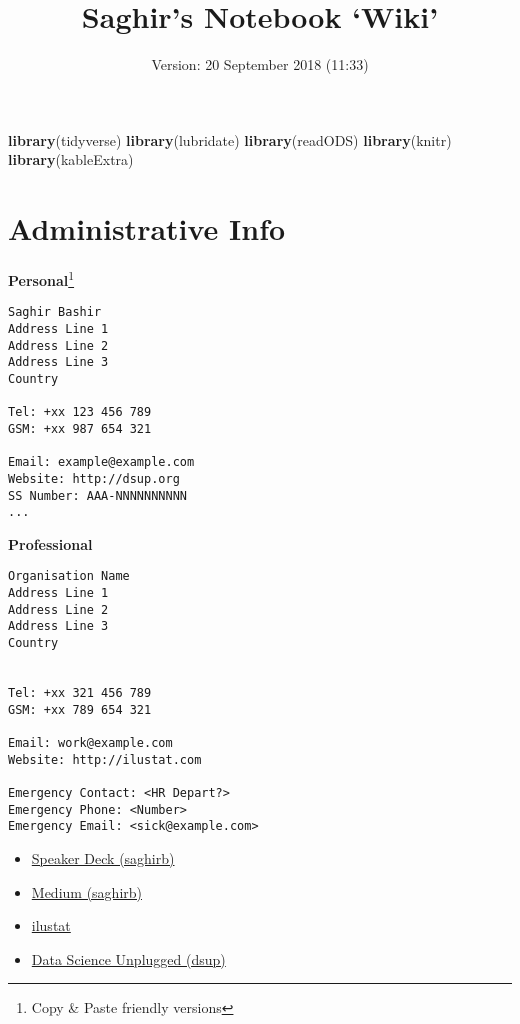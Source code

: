 \documentclass[]{book}
\title{Saghir's Notebook `Wiki'}
\author{}
\date{Version: 20 September 2018 (11:33)}
\newenvironment{Shaded}{\begin{snugshade}}{\end{snugshade}}
\newcommand{\KeywordTok}[1]{\textcolor[rgb]{0.13,0.29,0.53}{\textbf{#1}}}
\newcommand{\NormalTok}[1]{#1}
\providecommand{\tightlist}{%
  \setlength{\itemsep}{0pt}\setlength{\parskip}{0pt}}
\let\rmarkdownfootnote\footnote%
\def\footnote{\protect\rmarkdownfootnote}
\theoremstyle{definition}
\theoremstyle{definition}
\theoremstyle{definition}
\theoremstyle{remark}
\begin{document}
\maketitle

{
\setcounter{tocdepth}{1}
\tableofcontents
}
\begin{Shaded}
\begin{Highlighting}[]
\KeywordTok{library}\NormalTok{(tidyverse)}
\KeywordTok{library}\NormalTok{(lubridate)}
\KeywordTok{library}\NormalTok{(readODS)}
\KeywordTok{library}\NormalTok{(knitr)}
\KeywordTok{library}\NormalTok{(kableExtra)}
\end{Highlighting}
\end{Shaded}

\chapter{Administrative Info}\label{administrative-info}

\textbf{Personal}\footnote{Copy \& Paste friendly versions}

\begin{verbatim}
Saghir Bashir
Address Line 1
Address Line 2
Address Line 3
Country

Tel: +xx 123 456 789
GSM: +xx 987 654 321

Email: example@example.com
Website: http://dsup.org
SS Number: AAA-NNNNNNNNNN
...
\end{verbatim}

\textbf{Professional}

\begin{verbatim}
Organisation Name
Address Line 1
Address Line 2
Address Line 3
Country


Tel: +xx 321 456 789
GSM: +xx 789 654 321

Email: work@example.com
Website: http://ilustat.com

Emergency Contact: <HR Depart?>
Emergency Phone: <Number>
Emergency Email: <sick@example.com>
\end{verbatim}

\begin{itemize}
\tightlist
\item
  \href{https://speakerdeck.com/saghirb}{Speaker Deck (saghirb)}
\item
  \href{https://medium.com/@saghirb}{Medium (saghirb)}
\item
  \href{http://ilustat.com/}{ilustat}
\item
  \href{http://dsup.org/}{Data Science Unplugged (dsup)}
\end{itemize}
\end{document}
